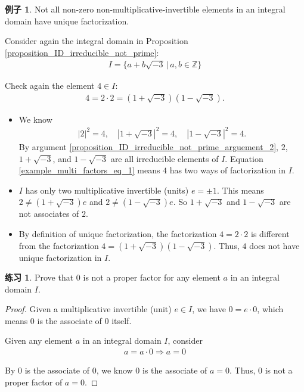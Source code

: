 \documentclass[utf8]{ctexbook}
\theoremstyle{definition}
\newtheorem{example}{例子}[section]
\newtheorem{exercise}{练习}[section]
\begin{document}
\begin{example}\label{example_unique_factorization_multi_factors}
Not all non-zero non-multiplicative-invertible elements in an integral domain have unique factorization.

Consider again the integral domain in Proposition \ref{proposition_ID_irreducible_not_prime}: 
\begin{align*}
I = \{ a + b \sqrt{-3} \, |\, a, b \in \mathbb{Z} \}
\end{align*}

Check again the element $ 4 \in I$:
\begin{align}
4 = 2 \cdot 2 = (1+ \sqrt{-3} ) (1 - \sqrt{-3}) . \label{example_multi_factors_eq_1}
\end{align}

\begin{itemize}
\item{We know
\begin{align*}
|2|^2 = 4, \quad |1 + \sqrt{-3}|^2 = 4, \quad |1 - \sqrt{-3}|^2 = 4 .
\end{align*}
By argument \ref{proposition_ID_irreducible_not_prime_arguement_2}, $2$, $1+ \sqrt{-3}$, and $1 - \sqrt{-3}$ are all irreducible elements of $I$. Equation \ref{example_multi_factors_eq_1} means $4$ has two ways of factorization in $I$.
}
\item{$I$ has only two multiplicative invertible (units) $e = \pm 1$. This means $ 2 \neq (1+ \sqrt{-3}) e $ and $2 \neq (1 - \sqrt{-3}) e$. So $1+ \sqrt{-3}$ and $1 - \sqrt{-3}$ are not associates of $2$. }
\item{By definition of unique factorization, the factorization $4 = 2 \cdot 2$ is different from the factorization $4 = (1+ \sqrt{-3} ) (1 - \sqrt{-3})$. Thus, $4$ does not have unique factorization in $I$.}
\end{itemize}



\end{example}

\begin{exercise}
Prove that $0$ is not a proper factor for any element $a$ in an integral domain $I$. 
\end{exercise}

\begin{proof}
Given a multiplicative invertible (unit) $e \in I$, we have $ 0 = e \cdot 0$, which means $0$ is the associate of $0$ itself.

Given any element $a $ in an integral domain $I$, consider
\begin{align*}
a = a \cdot 0 \Longrightarrow a = 0
\end{align*}

By $0$ is the associate of $0$, we know $0$ is the associate of $a=0$. Thus, $0$ is not a proper factor of $a = 0$.

\end{proof}
\end{document}
